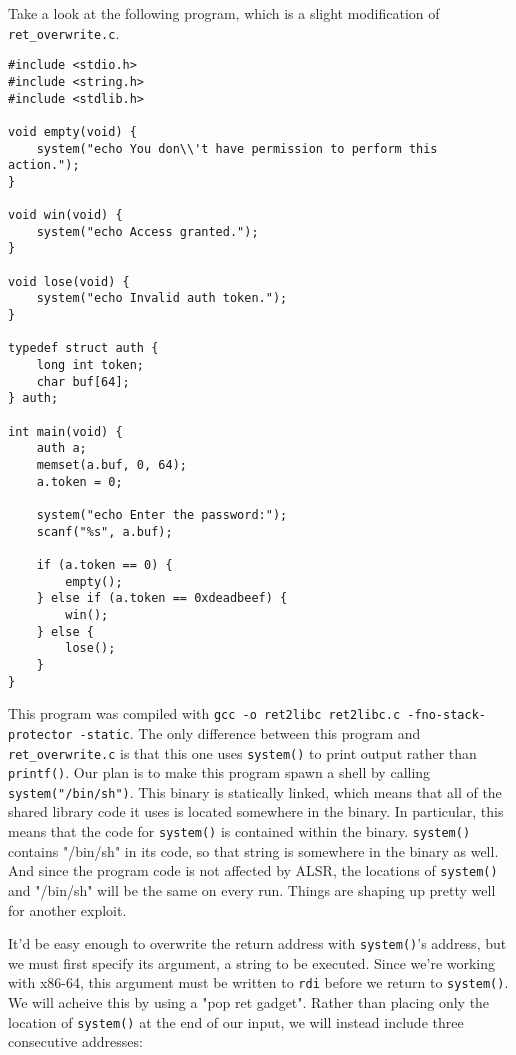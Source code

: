 \documentclass{article}
\begin{document}
Take a look at the following program, which is a slight modification of
\texttt{ret\_overwrite.c}.

\begin{lstlisting}
#include <stdio.h>
#include <string.h>
#include <stdlib.h>

void empty(void) {
    system("echo You don\\'t have permission to perform this action.");
}

void win(void) {
    system("echo Access granted.");
}

void lose(void) {
    system("echo Invalid auth token.");
}

typedef struct auth {
    long int token;
    char buf[64];
} auth;

int main(void) {
    auth a;
    memset(a.buf, 0, 64);
    a.token = 0;

    system("echo Enter the password:");
    scanf("%s", a.buf);

    if (a.token == 0) {
        empty();
    } else if (a.token == 0xdeadbeef) {
        win();
    } else {
        lose();
    }
}
\end{lstlisting}

This program was compiled with \texttt{gcc -o ret2libc ret2libc.c
-fno-stack-protector -static}. The only difference between this program and
\texttt{ret\_overwrite.c} is that this one uses \texttt{system()} to print
output rather than \texttt{printf()}. Our plan is to make this program spawn a
shell by calling \texttt{system("/bin/sh")}. This binary is statically
linked, which means that all of the shared library code it uses is located
somewhere in the binary. In particular, this means that the code for
\texttt{system()} is contained within the binary. \texttt{system()} contains
"/bin/sh" in its code, so that string is somewhere in the binary as well. And
since the program code is not affected by ALSR, the locations of
\texttt{system()} and "/bin/sh" will be the same on every run. Things are
shaping up pretty well for another exploit.

It'd be easy enough to overwrite the return address with \texttt{system()}'s
address, but we must first specify its argument, a string to be executed. Since
we're working with x86-64, this argument must be written to \texttt{rdi} before
we return to \texttt{system()}. We will acheive this by using a "pop ret
gadget". Rather than placing only the location of \texttt{system()} at the end
of our input, we will instead include three consecutive addresses:
\end{document}
